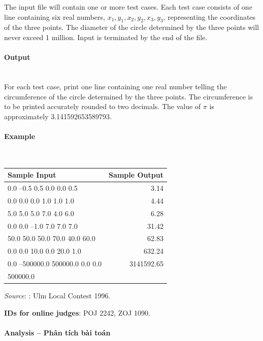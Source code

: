 \documentclass{article}
\begin{document}
The input file will contain one or more test cases. Each test case consists of one line containing six real
numbers, $x_1, y_1, x_2, y_2, x_3, y_3$, representing the coordinates of the three points. The diameter of the circle
determined by the three points will never exceed 1 million. Input is terminated by the end of the file.

\paragraph{Output}\mbox{} \\

For each test case, print one line containing one real number telling the circumference of the circle
determined by the three points. The circumference is to be printed accurately rounded to two decimals. The value of $\pi$ is approximately 3.141592653589793.


\paragraph{Example}\mbox{} \\

\begin{table}[h]
    \centering
    \begin{tabular}{|l|r|}
        \hline
        \textbf{Sample Input} & \textbf{Sample Output} \\
        \hline
        0.0 –0.5 0.5 0.0 0.0 0.5    & 3.14  \\ 
        0.0 0.0 0.0 1.0 1.0 1.0    & 4.44 \\ 
        5.0 5.0 5.0 7.0 4.0 6.0    & 6.28 \\ 
        0.0 0.0 –1.0 7.0 7.0 7.0    & 31.42 \\ 
        50.0 50.0 50.0 70.0 40.0 60.0 & 62.83  \\ 
        0.0 0.0 10.0 0.0 20.0 1.0    & 632.24 \\ 
        0.0 –500000.0 500000.0 0.0 0.0 & 3141592.65\\
        500000.0 & \\
         \hline
    \end{tabular}
\end{table}

\textit{Source}: : Ulm Local Contest 1996.

\textbf{IDs for online judges}: POJ 2242, ZOJ 1090.


\paragraph{Analysis -- Phân tích bài toán} \mbox{} \\
\end{document}
